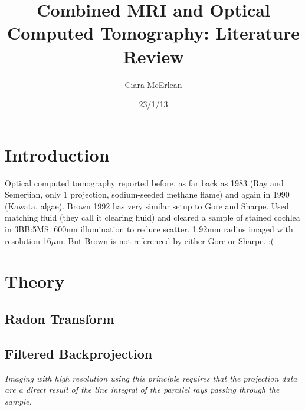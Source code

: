 \documentclass[12pt]{article}
\begin{document}
 
\title{Combined MRI and Optical Computed Tomography: Literature Review} 
\author{Ciara McErlean}
\date{23/1/13} 
\maketitle 

\section{Introduction}
\label{sec:intro}

Optical computed tomography reported before, as far back as 1983 (Ray and Semerjian, only 1 projection, sodium-seeded methane flame)\cite{ray1983laser} and again in 1990 (Kawata, algae)\cite{kawata1990laser}. Brown 1992 \cite{Brown:1992} has very similar setup to Gore and Sharpe. Used matching fluid (they call it clearing fluid) and cleared a sample of stained cochlea in 3BB:5MS. 600nm illumination to reduce scatter. 1.92mm radius imaged with resolution 16$\mu$m. But Brown is not referenced by either Gore or Sharpe. :(

\section{Theory}
\label{sec:theory}

\subsection{Radon Transform}


\subsection{Filtered Backprojection}
\label{subsec:FBP}






 \textit{Imaging with high resolution using this principle requires that the projection data are a direct result of the line integral of   the   parallel   rays   passing   through   the   sample.
} \cite{Wang:2006hy}
\end{document}
